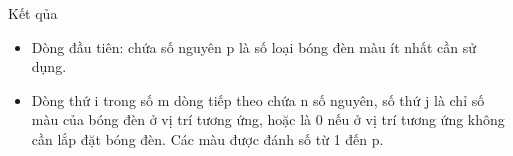 Kết qủa
\begin{itemize}
	\item     Dòng đầu tiên: chứa số nguyên p là số loại bóng đèn màu ít nhất cần sử dụng.   
	\item     Dòng thứ i trong số m dòng tiếp theo chứa n số nguyên, số thứ j là chỉ số màu của bóng đèn ở vị trí tương ứng, hoặc là 0 nếu ở vị trí tương ứng   không cần lắp đặt bóng đèn. Các màu được đánh số từ 1 đến p.   
\end{itemize}
